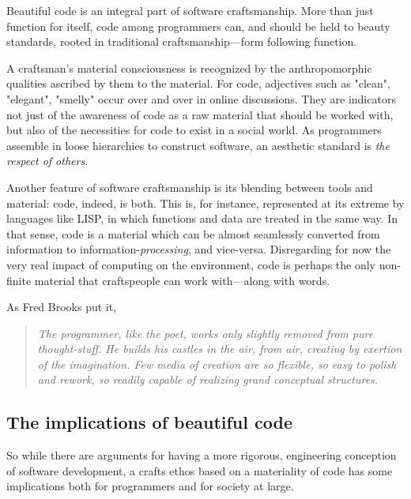 \documentclass{article}
\begin{document}
Beautiful code is an integral part of software craftsmanship\cite{oram_beautiful_2007}. More than just function for itself, code among programmers can, and should be held to beauty standards\cite{pineiro_aesthetics_2003}, rooted in traditional craftsmanship---form following function.

A craftsman's material consciousness is recognized by the anthropomorphic qualities ascribed by them to the material\cite{sennett_craftsman_2009}. For code, adjectives such as "clean", "elegant", "smelly" occur over and over in online discussions. They are indicators not just of the awareness of code as a raw material that should be worked with, but also of the necessities for code to exist in a social world. As programmers assemble in loose hierarchies to construct software, an aesthetic standard is \emph{the respect of others}\cite{abelson_structure_1979}.

Another feature of software craftsmanship is its blending between tools and material: code, indeed, is both. This is, for instance, represented at its extreme by languages like LISP, in which functions and data are treated in the same way\cite{mccarthy_lisp_1965}. In that sense, code is a material which can be almost seamlessly converted from information to information-\emph{processing}, and vice-versa. Disregarding for now the very real impact of computing on the environment\cite{kurp_green_2008}, code is perhaps the only non-finite material that craftspeople can work with---along with words.

As Fred Brooks put it,

\begin{quote}
    \textit{The programmer, like the poet, works only slightly removed from pure thought-stuff. He builds his castles in the air, from air, creating by exertion of the imagination. Few media of creation are so flexible, so easy to polish and rework, so readily capable of realizing grand conceptual structures.\cite{brooks_mythical_1975}}
\end{quote}

\subsection{The implications of beautiful code}

So while there are arguments for having a more rigorous, engineering conception of software development\cite{ensmenger_computer_2012}, a crafts ethos based on a materiality of code has some implications both for programmers and for society at large.
\end{document}
